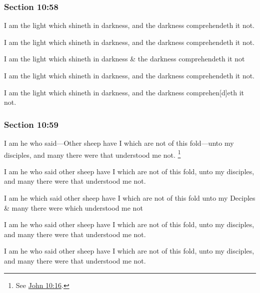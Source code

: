 	\subsubsection{Section 10:58} %
		\label{DC10-58}

		I am the light which shineth in darkness, and the darkness comprehendeth it not.

		\begin{framed}
		\scriptsize
			\begin{compactdesc}
				\item[JSP] I am the light which shineth in darkness, and the darkness comprehendeth it not.
				\item[RB1] I am the light which shineth in darkness \& the darkness comprehendeth it not
				\item[DC 1835] I am the light which shineth in darkness, and the darkness comprehendeth it not.
				\item[DC 1844] I am the light which shineth in darkness, and the darkness comprehen[d]eth it not.
			\end{compactdesc}
		\end{framed}

	\subsubsection{Section 10:59} %
		\label{DC10-59}

		I am he who said---Other sheep have I which are not of this fold---unto my disciples, and many there were that understood me not.%
			\footnote{%
				See \hyperref[JOHN-10-16]{John 10:16}.
				}

		\begin{framed}
		\scriptsize
			\begin{compactdesc}
				\item[JSP] I am he who said other sheep have I which are not of this fold, unto my disciples, and many there were that understood me not.
				\item[RB1] I am he which said other sheep have I which are not of this fold unto my Deciples \& many there were which understood me not
				\item[DC 1835] I am he who said other sheep have I which are not of this fold, unto my disciples, and many there were that understood me not.
				\item[DC 1844] I am he who said other sheep have I which are not of this fold, unto my disciples, and many there were that understood me not.
			\end{compactdesc}
		\end{framed}

